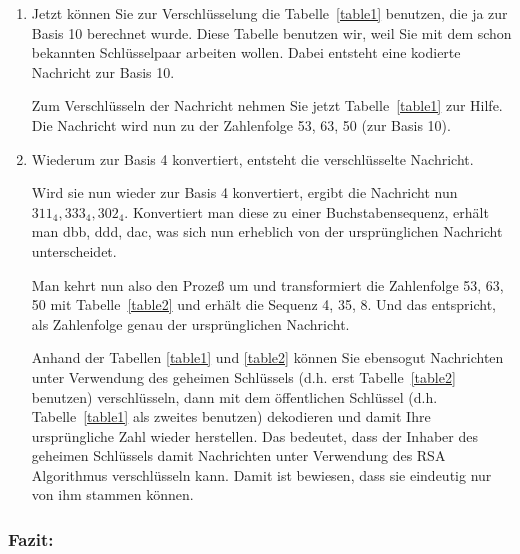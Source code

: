\documentclass[a4paper,11pt, oneside,openright,titlepage,dvips]{scrbook}
\newcommand{\IncludeImage}[2][]{\texorhtml{%
\texttt{[image: \#2]}%
}{%
\htmlimg{#2.png}%
}}
\newcounter{chapter}
\newcounter{section}[chapter]
\begin{document}
\begin{enumerate}



\clearpage
\item Jetzt können Sie zur Verschlüsselung die Tabelle~\ref{table1} benutzen, die ja
zur Basis 10 berechnet wurde. Diese Tabelle benutzen wir, weil Sie mit
dem schon bekannten Schlüsselpaar arbeiten wollen. Dabei entsteht eine
kodierte Nachricht zur Basis 10.

Zum Verschlüsseln der Nachricht nehmen Sie jetzt Tabelle~\ref{table1} zur Hilfe.
Die Nachricht wird nun zu der Zahlenfolge 53, 63, 50 (zur Basis 10).

\begin{center}
\IncludeImage[width=0.9\textwidth]{table-1}
\end{center}

\item Wiederum zur Basis 4 konvertiert, entsteht die verschlüsselte
Nachricht.

Wird sie nun wieder zur Basis 4 konvertiert, ergibt die Nachricht nun
$311_4, 333_4, 302_4$.  Konvertiert man diese zu einer
Buchstabensequenz, erhält man dbb, ddd, dac, was sich nun erheblich
von der ursprünglichen Nachricht unterscheidet.

Man kehrt nun also den Prozeß um und transformiert die Zahlenfolge 53,
63, 50 mit Tabelle~\ref{table2} und erhält die Sequenz 4, 35, 8. Und das
entspricht, als Zahlenfolge genau der ursprünglichen Nachricht.

Anhand der Tabellen \ref{table1} und \ref{table2} können Sie ebensogut Nachrichten unter
Verwendung des geheimen Schlüssels (d.h. erst Tabelle~\ref{table2} benutzen)
verschlüsseln, dann mit dem öffentlichen Schlüssel (d.h.
Tabelle~\ref{table1} als
zweites benutzen) dekodieren und damit Ihre ursprüngliche Zahl
wieder herstellen. Das bedeutet, dass der Inhaber des geheimen
Schlüssels damit Nachrichten unter Verwendung des RSA Algorithmus
verschlüsseln kann.  Damit ist bewiesen, dass sie eindeutig nur von
ihm stammen können.
\end{enumerate}

\clearpage
\subsubsection{Fazit:}
\end{document}
